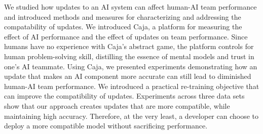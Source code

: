 \documentclass[letterpaper]{article} %
\newcommand{\bug}
    {\mbox{\rule{2mm}{2mm}}}
\newcommand{\Bug}[1]
    {\bug \footnote{BUG: {#1}}}
\newcommand{\?}{\mbox{?}}
\newcommand{\plat}{{\sc Caja}}
\begin{document}
    
    
    We studied how updates to an AI system can affect human-AI team performance and introduced methods and measures for characterizing and addressing the compatability of updates. We introduced \plat, a platform for measuring the effect of AI performance and the effect of updates on team performance. Since humans have no experience with \plat's abstract game, the platform controls for human problem-solving skill, distilling the essence of mental models and trust in one's AI teammate.
    Using \plat, we presented experiments  demonstrating how an update that makes an AI component more accurate can still lead to diminished human-AI team performance. %
    We introduced a practical re-training objective that can improve the compatibility of updates. 
    Experiments across three data sets show that our  approach creates updates that are more compatible, while maintaining high accuracy. 
    Therefore, at the very least, a developer can choose to deploy a more compatible model without sacrificing performance. 
    
    
\end{document}
